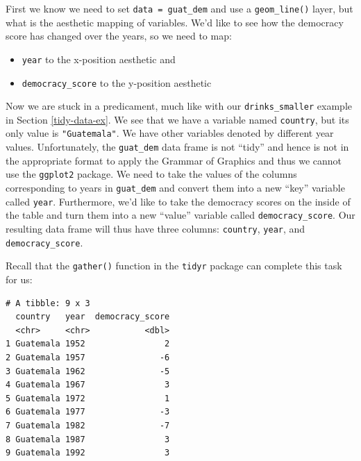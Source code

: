 \documentclass[12pt, krantz2,]{krantz}
\makeatletter
\newenvironment{Shaded}{\begin{snugshade}}{\end{snugshade}}
\newcommand{\DataTypeTok}[1]{\textcolor[rgb]{0.27,0.27,0.27}{#1}}
\newcommand{\KeywordTok}[1]{\textcolor[rgb]{0.27,0.27,0.27}{\textbf{#1}}}
\newcommand{\NormalTok}[1]{#1}
\newcommand{\OperatorTok}[1]{\textcolor[rgb]{0.43,0.43,0.43}{\textbf{#1}}}
\newcommand{\StringTok}[1]{\textcolor[rgb]{0.5,0.5,0.5}{#1}}
\providecommand{\tightlist}{%
  \setlength{\itemsep}{0pt}\setlength{\parskip}{0pt}}
\newenvironment{kframe}{%
\medskip{}
\setlength{\fboxsep}{.8em}
 \def\at@end@of@kframe{}%
 \ifinner\ifhmode%
  \def\at@end@of@kframe{\end{minipage}}%
  \begin{minipage}{\columnwidth}%
 \fi\fi%
 \def\FrameCommand##1{\hskip\@totalleftmargin \hskip-\fboxsep
 \colorbox{shadecolor}{##1}\hskip-\fboxsep
     \hskip-\linewidth \hskip-\@totalleftmargin \hskip\columnwidth}%
 \MakeFramed {\advance\hsize-\width
   \@totalleftmargin\z@ \linewidth\hsize
   \@setminipage}}%
 {\par\unskip\endMakeFramed%
 \at@end@of@kframe}
\renewenvironment{Shaded}{\begin{kframe}}{\end{kframe}}
\makeatother
\begin{document}
First we know we need to set \texttt{data\ =\ guat\_dem} and use a \texttt{geom\_line()} layer, but what is the aesthetic mapping of variables. We'd like to see how the democracy score has changed over the years, so we need to map:

\begin{itemize}
\tightlist
\item
  \texttt{year} to the x-position aesthetic and
\item
  \texttt{democracy\_score} to the y-position aesthetic
\end{itemize}

Now we are stuck in a predicament, much like with our \texttt{drinks\_smaller} example in Section \ref{tidy-data-ex}. We see that we have a variable named \texttt{country}, but its only value is \texttt{"Guatemala"}. We have other variables denoted by different year values. Unfortunately, the \texttt{guat\_dem} data frame is not ``tidy'' and hence is not in the appropriate format to apply the Grammar of Graphics and thus we cannot use the \texttt{ggplot2} package. We need to take the values of the columns corresponding to years in \texttt{guat\_dem} and convert them into a new ``key'' variable called \texttt{year}. Furthermore, we'd like to take the democracy scores on the inside of the table and turn them into a new ``value'' variable called \texttt{democracy\_score}. Our resulting data frame will thus have three columns: \texttt{country}, \texttt{year}, and \texttt{democracy\_score}.

Recall that the \texttt{gather()} function in the \texttt{tidyr} package can complete this task for us:

\begin{Shaded}
\end{Shaded}

\begin{verbatim}
# A tibble: 9 x 3
  country   year  democracy_score
  <chr>     <chr>           <dbl>
1 Guatemala 1952                2
2 Guatemala 1957               -6
3 Guatemala 1962               -5
4 Guatemala 1967                3
5 Guatemala 1972                1
6 Guatemala 1977               -3
7 Guatemala 1982               -7
8 Guatemala 1987                3
9 Guatemala 1992                3
\end{verbatim}
\end{document}

